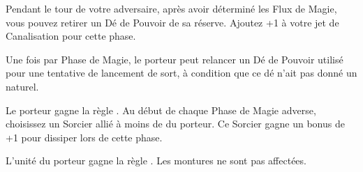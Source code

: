 \endpricelist

\armyarcaneitems

\startpricelist

Pendant le tour de votre adversaire, après avoir déterminé les Flux de Magie, vous pouvez retirer un Dé de Pouvoir de sa réserve. Ajoutez +1 à votre jet de Canalisation pour cette phase.

Une fois par Phase de Magie, le porteur peut relancer un Dé de Pouvoir utilisé pour une tentative de lancement de sort, à condition que ce dé n'ait pas donné un  naturel.

\endpricelist

\armymagicalbanners

\startpricelist

Le porteur gagne la règle \channel{}. Au début de chaque Phase de Magie adverse, choisissez un Sorcier allié à moins de  du porteur. Ce Sorcier gagne un bonus de +1 pour dissiper lors de cette phase.

L'unité du porteur gagne la règle \thunderouscharge{}. Les montures ne sont pas affectées.

\endpricelist

\closearmymagicalitems








\quickrefsheettitle

